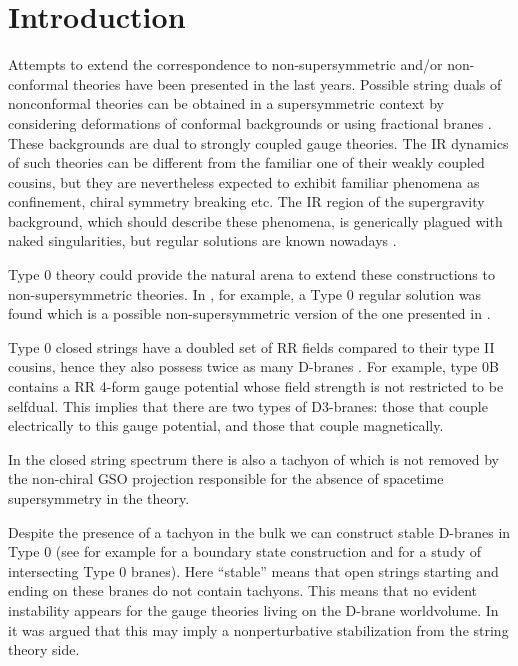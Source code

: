 \documentclass[a4paper,12pt]{article}
\begin{document}
\section{Introduction}
Attempts to extend the \coordHE{} correspondence to non-supersymmetric and/or
non-conformal theories have been presented in the last years. Possible string duals of nonconformal theories can be obtained in a supersymmetric context by considering deformations of conformal backgrounds
 \cite{gppz,freed} or using fractional branes \cite{kn,ktfrac,ks,mn}. These backgrounds are dual to strongly coupled gauge theories. The IR dynamics of such theories can be different from the familiar one of their weakly coupled cousins, 
but they are nevertheless expected to exhibit familiar phenomena as 
confinement, chiral symmetry breaking etc. The IR region of the 
supergravity background, which should describe these phenomena, is
generically plagued with naked singularities, but regular solutions
are known nowadays \cite{ks}.
 
Type 0 theory could provide the natural arena to extend these constructions to
non-supersymmetric theories. In \cite{bgz}, for example, a Type 0 regular 
solution was found which is a possible non-supersymmetric version of the one 
presented in \cite{ks}.

Type 0 closed strings have a doubled set of RR fields compared to their type II cousins, 
hence they also possess twice as many D-branes \cite{kt}. For example,  type 0B
contains a RR  4-form gauge potential whose field strength is not restricted to be
selfdual. This implies that there are two types of D3-branes: 
those that couple electrically to this gauge potential, and those that couple 
magnetically.

In the closed string spectrum there is also a tachyon of 
\coordHE{} which is not removed by the non-chiral GSO 
projection \coordHE{} responsible for the absence of spacetime supersymmetry in the theory.

Despite the presence of a tachyon in the bulk we can 
construct stable D-branes in Type 0 (see for example \cite{berg} for a boundary state
construction and \cite{costa} for a study of intersecting Type 0 branes). Here ``stable'' means that open strings starting
and ending on these branes do not contain tachyons. This means that no evident
instability appears for the  gauge theories living on the D-brane worldvolume. In \cite{kt1,k} it was argued that this may imply a nonperturbative stabilization from the string theory side. 
\end{document}

